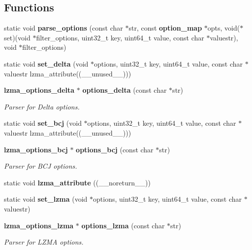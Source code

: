 \subsection*{Functions}
\begin{DoxyCompactItemize}
\item 
static void {\bf parse\-\_\-options} (const char $\ast$str, const {\bf option\-\_\-map} $\ast$opts, void($\ast$set)(void $\ast$filter\-\_\-options, uint32\-\_\-t key, uint64\-\_\-t value, const char $\ast$valuestr), void $\ast$filter\-\_\-options)
\item 
static void {\bfseries set\-\_\-delta} (void $\ast$options, uint32\-\_\-t key, uint64\-\_\-t value, const char $\ast$valuestr lzma\-\_\-attribute((\-\_\-\-\_\-unused\-\_\-\-\_\-)))\label{options_8c_ad3311c7e0fe1e9c92be98ab38a6460ed}

\item 
{\bf lzma\-\_\-options\-\_\-delta} $\ast$ {\bf options\-\_\-delta} (const char $\ast$str)
\begin{DoxyCompactList}\small\item\em Parser for Delta options. \end{DoxyCompactList}\item 
static void {\bfseries set\-\_\-bcj} (void $\ast$options, uint32\-\_\-t key, uint64\-\_\-t value, const char $\ast$valuestr lzma\-\_\-attribute((\-\_\-\-\_\-unused\-\_\-\-\_\-)))\label{options_8c_a51cffcb4b421f4243c204ce6754c9e35}

\item 
{\bf lzma\-\_\-options\-\_\-bcj} $\ast$ {\bf options\-\_\-bcj} (const char $\ast$str)
\begin{DoxyCompactList}\small\item\em Parser for B\-C\-J options. \end{DoxyCompactList}\item 
static void {\bfseries lzma\-\_\-attribute} ((\-\_\-\-\_\-noreturn\-\_\-\-\_\-))\label{options_8c_a1957d0c8f6ec2eb4950e67226425ee7c}

\item 
static void {\bfseries set\-\_\-lzma} (void $\ast$options, uint32\-\_\-t key, uint64\-\_\-t value, const char $\ast$valuestr)\label{options_8c_a9223b1f5f335c24fd65804d977f07708}

\item 
{\bf lzma\-\_\-options\-\_\-lzma} $\ast$ {\bf options\-\_\-lzma} (const char $\ast$str)
\begin{DoxyCompactList}\small\item\em Parser for L\-Z\-M\-A options. \end{DoxyCompactList}\end{DoxyCompactItemize}


